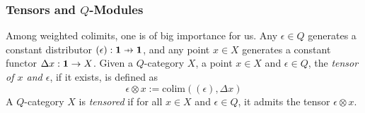 %
%
%
%
%
% 
%
% 
%
%
%


\subsubsection{Tensors and $Q$-Modules}

Among weighted colimits, one is of big importance for us. 
Any $\epsilon \in Q$ generates a constant distributor $(\epsilon):\B 1\pfun \B 1$, and any point $x\in X$ generates a constant functor $\Delta x: \mathbf{1}\to X$.
Given a $Q$-category $X$, a point $x\in X$ and  $\epsilon \in Q$, the \emph{tensor of $x$ and $\epsilon$}, if it exists, is defined as
$$
\epsilon \otimes x := \mathrm{colim}((\epsilon), \Delta x)
$$
A $Q$-category $X$ is \emph{tensored} if for all $x\in X$ and $\epsilon \in Q$, it admits the tensor $\epsilon \otimes x$.


